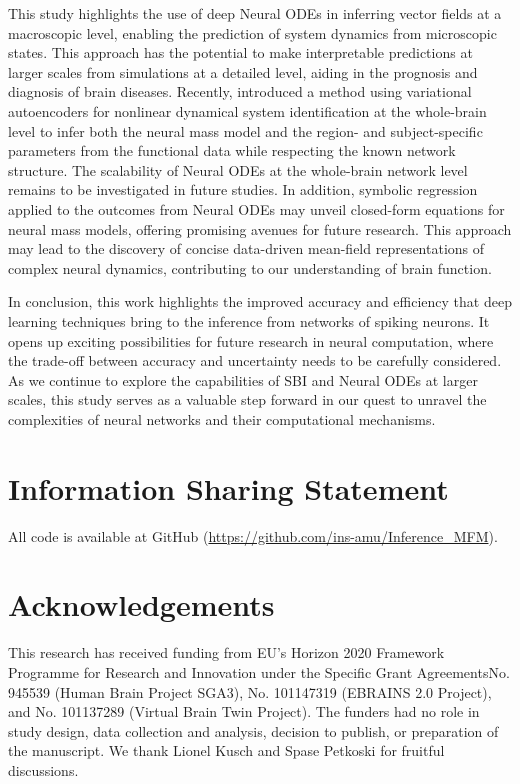 \documentclass[preprint,11pt,authoryear]{elsarticle}
\begin{document}
This study highlights the use of deep Neural ODEs in inferring vector fields at a macroscopic level, enabling the prediction of system dynamics from microscopic states. This approach has the potential to make interpretable predictions at larger scales from simulations at a detailed level, aiding in the prognosis and diagnosis of brain diseases. Recently, \cite{Sip2023} introduced a method using variational autoencoders for nonlinear dynamical system identification at the whole-brain level to infer both the neural mass model and the region- and subject-specific parameters from the functional data while respecting the known network structure. The scalability of Neural ODEs at the whole-brain network level remains to be investigated in future studies. In addition, symbolic regression applied to the outcomes from Neural ODEs may unveil closed-form equations for neural mass models, offering promising avenues for future research. This approach may lead to the discovery of concise data-driven mean-field representations of complex neural dynamics, contributing to our understanding of brain function.



In conclusion, this work highlights the improved accuracy and efficiency that deep learning techniques bring to the inference from networks of spiking neurons. It opens up exciting possibilities for future research in neural computation, where the trade-off between accuracy and uncertainty needs to be carefully considered. As we continue to explore the capabilities of SBI and Neural ODEs at larger scales, this study serves as a valuable step forward in our quest to unravel the complexities of neural networks and their computational mechanisms.




\section*{Information Sharing Statement}

All code is available at GitHub (\url{https://github.com/ins-amu/Inference_MFM}).


\section*{Acknowledgements}

This research has received funding from EU's Horizon 2020 Framework Programme for Research and Innovation under the Specific Grant AgreementsNo. 945539 (Human Brain Project SGA3), No. 101147319 (EBRAINS 2.0 Project), and No. 101137289 (Virtual Brain Twin Project). The funders had no role in study design, data collection and analysis, decision to publish, or preparation of the manuscript. We thank Lionel Kusch and Spase Petkoski for fruitful discussions.
\end{document}
